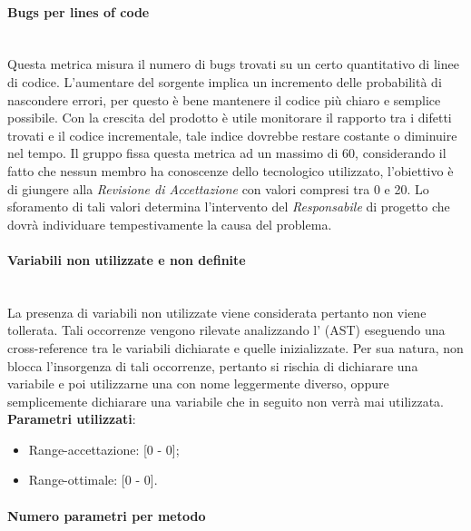 			
			\paragraph{Bugs per lines of code}\mbox{} \\
			
			Questa metrica misura il numero di bugs trovati su un certo quantitativo di linee di codice. L'aumentare del sorgente implica un incremento delle probabilità di nascondere errori, per questo è bene mantenere il codice più chiaro e semplice possibile. Con la crescita del prodotto è utile monitorare il rapporto tra i difetti trovati e il codice incrementale, tale indice dovrebbe restare costante o diminuire nel tempo.
			Il gruppo fissa questa metrica ad un massimo di 60, considerando il fatto che nessun membro ha conoscenze dello  tecnologico utilizzato, l’obiettivo è di giungere alla \textit{Revisione di Accettazione} con valori compresi tra 0 e 20. Lo sforamento di tali valori determina l’intervento del \textit{Responsabile} di progetto che dovrà individuare tempestivamente la causa del problema.


			\paragraph{Variabili non utilizzate e non definite}\mbox{} \\
				
			La presenza di variabili non utilizzate viene considerata  pertanto non viene tollerata. Tali occorrenze vengono rilevate analizzando l' (AST) eseguendo una cross-reference tra le variabili dichiarate e quelle inizializzate. Per sua natura,  non blocca l'insorgenza di tali occorrenze, pertanto si rischia di dichiarare una variabile e poi utilizzarne una con nome leggermente diverso, oppure semplicemente dichiarare una variabile che in seguito non verrà mai utilizzata.\\
			\textbf{Parametri utilizzati}:
			\begin{itemize}
				\item Range-accettazione: [0 - 0];
				\item Range-ottimale: [0 - 0].
			\end{itemize}

			
			\paragraph{Numero parametri per metodo}\mbox{} \\
				
